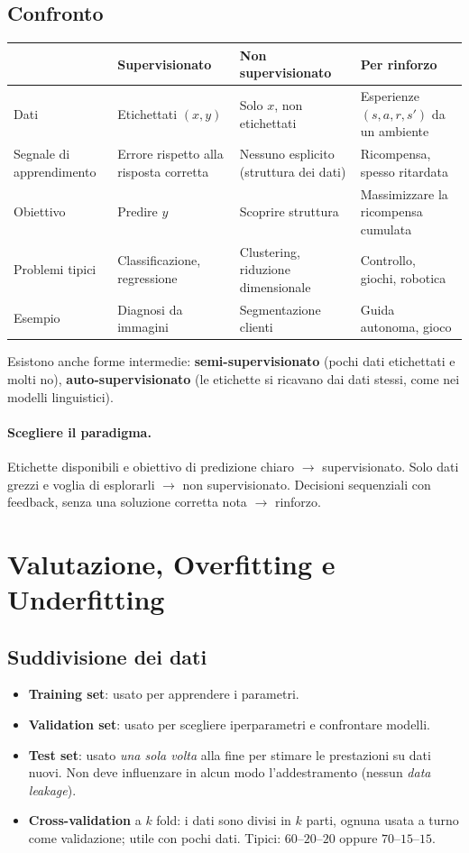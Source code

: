 \subsection{Confronto}
\begin{center}
\begin{tabularx}{\textwidth}{@{}lXXX@{}}
\toprule
 & \textbf{Supervisionato} & \textbf{Non supervisionato} & \textbf{Per rinforzo} \\
\midrule
Dati & Etichettati $(x,y)$ & Solo $x$, non etichettati & Esperienze $(s,a,r,s')$ da un ambiente \\
Segnale di apprendimento & Errore rispetto alla risposta corretta & Nessuno esplicito (struttura dei dati) & Ricompensa, spesso ritardata \\
Obiettivo & Predire $y$ & Scoprire struttura & Massimizzare la ricompensa cumulata \\
Problemi tipici & Classificazione, regressione & Clustering, riduzione dimensionale & Controllo, giochi, robotica \\
Esempio & Diagnosi da immagini & Segmentazione clienti & Guida autonoma, gioco \\
\bottomrule
\end{tabularx}
\end{center}

Esistono anche forme intermedie: \textbf{semi-supervisionato} (pochi dati etichettati e molti no), \textbf{auto-supervisionato} (le etichette si ricavano dai dati stessi, come nei modelli linguistici).

\paragraph{Scegliere il paradigma.} Etichette disponibili e obiettivo di predizione chiaro $\to$ supervisionato. Solo dati grezzi e voglia di esplorarli $\to$ non supervisionato. Decisioni sequenziali con feedback, senza una soluzione corretta nota $\to$ rinforzo.

\section{Valutazione, Overfitting e Underfitting}

\subsection{Suddivisione dei dati}
\begin{itemize}
    \item \textbf{Training set}: usato per apprendere i parametri.
    \item \textbf{Validation set}: usato per scegliere iperparametri e confrontare modelli.
    \item \textbf{Test set}: usato \emph{una sola volta} alla fine per stimare le prestazioni su dati nuovi. Non deve influenzare in alcun modo l'addestramento (nessun \emph{data leakage}).
    \item \textbf{Cross-validation} a $k$ fold: i dati sono divisi in $k$ parti, ognuna usata a turno come validazione; utile con pochi dati. Tipici: $60$--$20$--$20$ oppure $70$--$15$--$15$.
\end{itemize}

